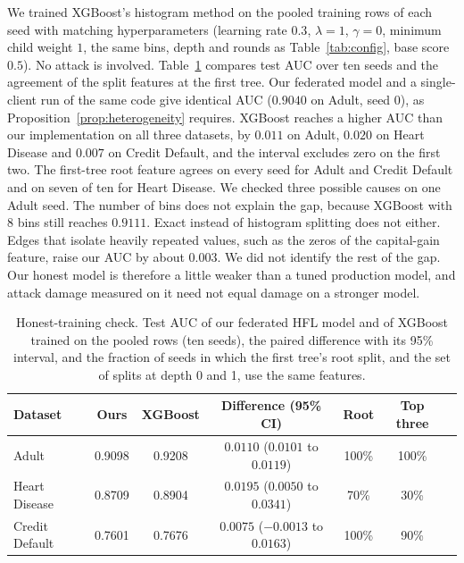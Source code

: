 \documentclass[11pt]{article}
\newcommand{\rev}[1]{{\color{blue}#1}}
\newcommand{\revfloat}[1]{{\color{blue}#1}}
\begin{document}
\rev{We trained XGBoost's histogram method on the pooled training rows of each seed with matching hyperparameters (learning rate $0.3$, $\lambda=1$, $\gamma=0$, minimum child weight $1$, the same bins, depth and rounds as Table~\ref{tab:config}, base score $0.5$). No attack is involved. Table~\ref{tab:xgbcheck} compares test AUC over ten seeds and the agreement of the split features at the first tree. Our federated model and a single-client run of the same code give identical AUC ($0.9040$ on Adult, seed 0), as Proposition~\ref{prop:heterogeneity} requires. XGBoost reaches a higher AUC than our implementation on all three datasets, by $0.011$ on Adult, $0.020$ on Heart Disease and $0.007$ on Credit Default, and the interval excludes zero on the first two. The first-tree root feature agrees on every seed for Adult and Credit Default and on seven of ten for Heart Disease. We checked three possible causes on one Adult seed. The number of bins does not explain the gap, because XGBoost with 8 bins still reaches $0.9111$. Exact instead of histogram splitting does not either. Edges that isolate heavily repeated values, such as the zeros of the capital-gain feature, raise our AUC by about $0.003$. We did not identify the rest of the gap. Our honest model is therefore a little weaker than a tuned production model, and attack damage measured on it need not equal damage on a stronger model.}

\begin{table}[htbp]
\centering
\small
\revfloat{\caption{Honest-training check. Test AUC of our federated HFL model and of XGBoost trained on the pooled rows (ten seeds), the paired difference with its 95\% interval, and the fraction of seeds in which the first tree's root split, and the set of splits at depth 0 and 1, use the same features.}\label{tab:xgbcheck}}
\begin{tabular}{lcccccc}
\toprule
\rev{Dataset} & \rev{Ours} & \rev{XGBoost} & \rev{Difference (95\% CI)} & \rev{Root} & \rev{Top three} \\
\midrule
\rev{Adult} & \rev{0.9098} & \rev{0.9208} & \rev{$0.0110$ ($0.0101$ to $0.0119$)} & \rev{100\%} & \rev{100\%} \\
\rev{Heart Disease} & \rev{0.8709} & \rev{0.8904} & \rev{$0.0195$ ($0.0050$ to $0.0341$)} & \rev{70\%} & \rev{30\%} \\
\rev{Credit Default} & \rev{0.7601} & \rev{0.7676} & \rev{$0.0075$ ($-0.0013$ to $0.0163$)} & \rev{100\%} & \rev{90\%} \\
\bottomrule
\end{tabular}
\end{table}
\end{document}
